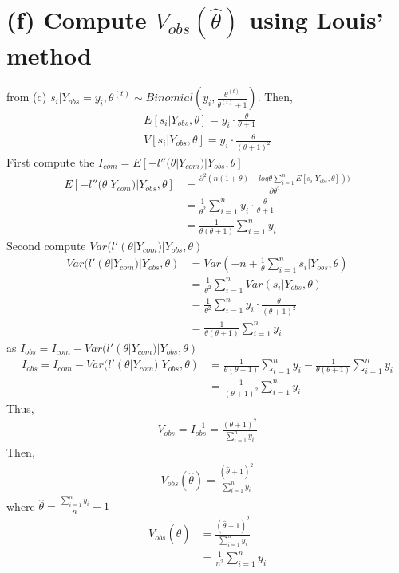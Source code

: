 \documentclass[11pt]{article}
\begin{document}
\section*{(f) Compute $V_{obs}(\hat{\theta})$ using Louis' method}
from (c) $s_i|Y_{obs}=y_i,\theta^{(t)} \sim Binomial\left(y_i,\frac{\theta^{(t)}}{\theta^{(t)} + 1}\right)$. Then,
\begin{align*}
E[s_i| Y_{obs}, \theta]= y_i\cdot\frac{\theta}{\theta + 1}\\
V[s_i| Y_{obs}, \theta]= y_i\cdot\frac{\theta}{(\theta + 1)^2}
\end{align*}
First compute the $I_{com} = E[-l''(\theta|Y_{com})|Y_{obs},\theta]$
\begin{align*}
E[-l''(\theta|Y_{com})|Y_{obs},\theta] &= \frac{\partial^2(n(1+\theta) -log\theta \sum_{i=1}^{n}E[s_i|Y_{obs},\theta]))}{\partial \theta^2}\\
&=\frac{1}{\theta^2} \sum_{i=1}^{n}y_i\cdot\frac{\theta}{\theta + 1}\\
&=\frac{1}{\theta(\theta +1)}\sum_{i=1}^{n}y_i
\end{align*}
Second compute $Var(l'(\theta|Y_{com})|Y_{obs},\theta)$
\begin{align*}
Var(l'(\theta|Y_{com})|Y_{obs},\theta) & = Var\left(-n + \frac{1}{\theta} \sum_{i=1}^{n}s_i|Y_{obs},\theta\right)\\
&=\frac{1}{\theta^2} \sum_{i=1}^{n} Var(s_i | Y_{obs},\theta)\\
&=\frac{1}{\theta^2}\sum_{i=1}^{n}y_i\cdot\frac{\theta}{(\theta + 1)^2}\\
&=\frac{1}{\theta(\theta + 1)} \sum_{i=1}^{n}y_i
\end{align*}
as $I_{obs} = I_{com} - Var(l'(\theta|Y_{com})|Y_{obs},\theta)$
\begin{align*}
I_{obs} = I_{com} - Var(l'(\theta|Y_{com})|Y_{obs},\theta) &= \frac{1}{\theta(\theta +1)}\sum_{i=1}^{n}y_i - \frac{1}{\theta(\theta + 1)} \sum_{i=1}^{n}y_i\\
&=\frac{1}{(\theta+1)^2}\sum_{i=1}^{n}y_i
\end{align*}
Thus,
\begin{align*}
V_{obs} = I_{obs}^{-1} = \frac{(\theta +1)^2}{\sum_{i=1}^{n}y_i}
\end{align*} 
Then,
\begin{align*}
V_{obs} (\hat{\theta})= \frac{(\hat{\theta} +1)^2}{\sum_{i=1}^{n}y_i}
\end{align*}
where $\hat{\theta} = \frac{\sum_{i=1}^{n}y_i}{n} - 1$
\begin{align*}
V_{obs} (\hat{\theta})&= \frac{(\hat{\theta} +1)^2}{\sum_{i=1}^{n}y_i}\\
&=\frac{1}{n^2}\sum_{i=1}^{n}y_i
\end{align*}
\end{document}
